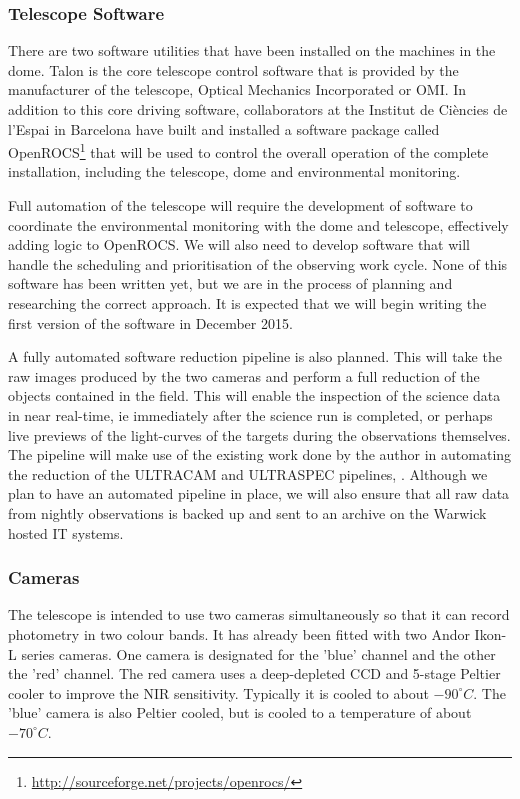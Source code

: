 \documentclass[a4paper,fleqn,usenatbib]{mnras}
\begin{document}
\subsubsection{Telescope Software}
There are two software utilities that have been installed on the machines in the dome. Talon is the core telescope control software that is provided by the manufacturer of the telescope, Optical Mechanics Incorporated or OMI. In addition to this core driving software, collaborators at the Institut de Ci\`{e}ncies de l'Espai in Barcelona have built and installed a software package called OpenROCS\footnote{\url{http://sourceforge.net/projects/openrocs/}} that will be used to control the overall operation of the complete installation, including the telescope, dome and environmental monitoring. 

Full automation of the telescope will require the development of software to coordinate the environmental monitoring with the dome and telescope, effectively adding logic to OpenROCS. We will also need to develop software that will handle the scheduling and prioritisation of the observing work cycle. None of this software has been written yet, but we are in the process of planning and researching the correct approach. It is expected that we will begin writing the first version of the software in December 2015. 

A fully automated software reduction pipeline is also planned. This will take the raw images produced by the two cameras and perform a full reduction of the objects contained in the field. This will enable the inspection of the science data in near real-time, ie immediately after the science run is completed, or perhaps live previews of the light-curves of the targets during the observations themselves. The pipeline will make use of the existing work done by the author in automating the reduction of the ULTRACAM and ULTRASPEC pipelines, \citep{RashleyMSC}. Although we plan to have an automated pipeline in place, we will also ensure that all raw data from nightly observations is backed up and sent to an archive on the Warwick hosted IT systems. 

\subsubsection{Cameras}
The telescope is intended to use two cameras simultaneously so that it can record photometry in two colour bands. It has already been fitted with two Andor Ikon-L series cameras. One camera is designated for the 'blue' channel and the other the 'red' channel. The red camera uses a deep-depleted CCD and 5-stage Peltier cooler to improve the NIR sensitivity. Typically it is cooled to about $-90^\circ C$. The 'blue' camera is also Peltier cooled, but is cooled to a temperature of about $-70^\circ C$.  
\end{document}
